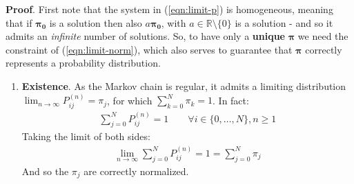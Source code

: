 \documentclass[../template.tex]{subfiles}
\begin{document}
\textbf{Proof}. First note that the system in (\ref{eqn:limit-p}) is homogeneous, meaning that if $\bm{\pi_0}$ is a solution then also $a \bm{\pi_0}$, with $a \in \mathbb{R} \setminus \{0\}$ is a solution - and so it admits an \textit{infinite} number of solutions. So, to have only a \textbf{unique} $\bm{\pi}$ we need the constraint of (\ref{eqn:limit-norm}), which also serves to guarantee that $\bm{\pi}$ correctly represents a probability distribution.

\medskip

\begin{enumerate}
    \item \textbf{Existence}. As the Markov chain is regular, it admits a limiting distribution $\lim_{n \to \infty} P_{ij}^{(n)} = \pi_j$, for which $\sum_{k=0}^N \pi_k = 1$. In fact:
    \begin{align*}
        \sum_{j=0}^N P_{ij}^{(n)} = 1 \qquad \forall i \in \{0,\dots,N\}, n \geq 1    
    \end{align*}
    Taking the limit of both sides:
    \begin{align*}
        \lim_{n \to \infty} \sum_{j=0}^N P_{ij}^{(n)} = 1 = \sum_{j=0}^N \pi_j 
    \end{align*}
    And so the $\pi_j$ are correctly normalized.

    \medskip


\end{enumerate}
\end{document}
